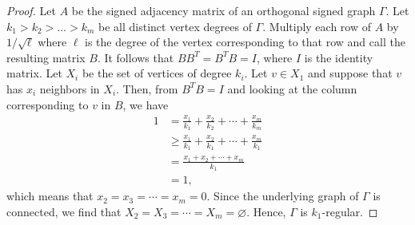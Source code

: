 \documentclass[10pt,a4paper]{amsart}
\begin{document}
\begin{proof}
Let $A$ be the  signed adjacency matrix of an orthogonal signed graph  $\Gamma$. Let $k_1> k_2>\dots> k_m$ be  all distinct vertex degrees of $\Gamma$.
Multiply  each row  of  $A$ by $1/\sqrt{\ell}$ where $\ell$ is the degree of the vertex corresponding to that row and call the resulting matrix $B$. It follows that $BB^T=B^TB=I$, where
$I$ is the identity matrix.
 Let $X_i$ be the set of vertices of degree $k_i$. Let $v\in X_1$ and suppose that $v$ has $x_i$ neighbors in $X_i$. Then, from  $B^TB=I$ and looking at the column corresponding to $v$ in $B$,
  we have
  \begin{align*}
 1&=\frac{x_1}{k_1}+\frac{x_2}{k_2}+\cdots+\frac{x_m}{k_m}\\
 &\geqslant\frac{x_1}{k_1}+\frac{x_2}{k_1}+\cdots+\frac{x_m}{k_1}\\
 &=\frac{x_1+x_2+\cdots+x_m}{k_1}\\
 &=1,
 \end{align*}
which means that  $x_2=x_3=\cdots=x_m=0$. Since the underlying graph of $\Gamma$ is connected, we find that  $X_2=X_3=\cdots=X_m=\varnothing$. Hence,
$\Gamma$ is $k_1$-regular.
\end{proof}
\end{document}
